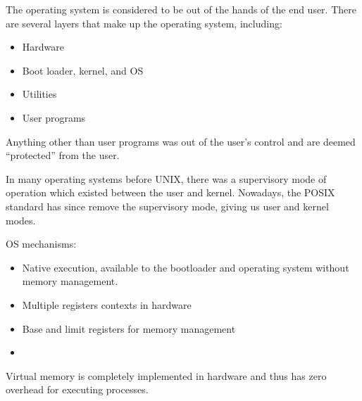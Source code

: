\documentclass[code]{amznotes}
\begin{document}
The operating system is considered to be out of the hands of the end user. There are several layers that make up the operating system, including:
\begin{itemize}
    \item Hardware
    \item Boot loader, kernel, and OS
    \item Utilities
    \item User programs
\end{itemize}
Anything other than user programs was out of the user's control and are deemed ``protected'' from the user.

In many operating systems before UNIX, there was a supervisory mode of operation which existed between the user and kernel. Nowadays, the POSIX standard has since remove the supervisory mode, giving us user and kernel modes.

OS mechanisms:
\begin{itemize}
    \item Native execution, available to the bootloader and operating system without memory management.
    \item Multiple registers contexts in hardware
    \item Base and limit registers for memory management
    \item 
\end{itemize}

\begin{notebox}
    Virtual memory is completely implemented in hardware and thus has zero overhead for executing processes.
\end{notebox}
\end{document}
